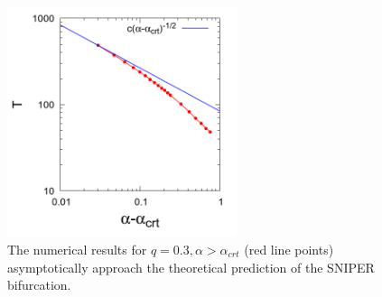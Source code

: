 \documentclass[lineno]{JFM-FLM_Au}
\begin{document}
\begin{figure}[!h]
	\begin{center}
		\includegraphics[width=0.6\textwidth]{plot/T_alpha_plots/I_0.0003000_q_0.300_initial_-4.80_element_20_T_alpha_plot_new.png}
		\caption{The numerical results for $q=0.3, \alpha>\alpha_{crt}$ (red line points) asymptotically approach the theoretical prediction of the SNIPER bifurcation.}
		\label{fig:25}
	\end{center}
\end{figure}

\end{document}
